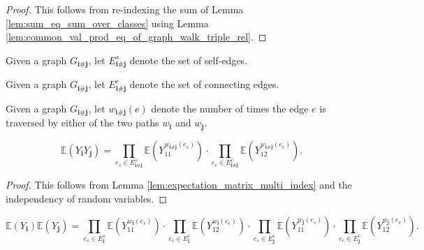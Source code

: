 \begin{proof}
  This follows from re-indexing the sum of Lemma \ref{lem:sum_eq_sum_over_classes} using Lemma \ref{lem:common_val_prod_eq_of_graph_walk_triple_rel}.
\end{proof}
\begin{definition}
  \notready
  \label{def:graph_walk_triple_single_edges}
  Given a graph $G_{\mathbf{i} \# \mathbf{j}}$, let $E^s_{\mathbf{i} \# \mathbf{j}}$ denote the set of self-edges.
\end{definition}
\begin{definition}
  \notready
  \label{def:graph_walk_triple_repeated_edges} %
  Given a graph $G_{\mathbf{i} \# \mathbf{j}}$, let $E^c_{\mathbf{i} \# \mathbf{j}}$ denote the set of connecting edges.
\end{definition}
\begin{definition}
  \notready
  \label{def:edgeCountPair}
  Given a graph $G_{\mathbf{i} \# \mathbf{j}}$, 
  let $w_{\mathbf{i} \# \mathbf{j}}(e)$ denote the number of times the edge $e$ is traversed by either of the two paths $w_\mathbf{i}$ and $w_\mathbf{j}$.
\end{definition}
\begin{lemma}
  \notready
  \label{lem:expect_mul_eq_prod_expect_edgewise_of_indep}
  \[
  \mathbb{E} (Y_\mathbf{i}Y_\mathbf{j}) 
  = \prod_{e_s \in E^s_{\mathbf{i} \# \mathbf{j}}} \mathbb{E} (Y_{11}^{w_{\mathbf{i} \# \mathbf{j}}(e_s)}) \cdot \prod_{e_c \in E^c_{\mathbf{i} \# \mathbf{j}}} \mathbb{E} (Y_{12}^{w_{\mathbf{i} \# \mathbf{j}}(e_c)}).
  \]
\end{lemma}
\begin{proof}
  This follows from Lemma \ref{lem:expectation_matrix_multi_index} and the independency of random variables.
\end{proof}
\begin{lemma}
  \notready
  \label{lem:expect_mul_eq_prod_expect_edgewise_mul_prod_expect_edgewise}
  \[
  \mathbb{E}(Y_\mathbf{i}) \mathbb{E}(Y_\mathbf{j}) 
  = \prod_{e_s \in E^s_{\mathbf{i}}} \mathbb{E} (Y_{11}^{w_{\mathbf{i}}(e_s)}) \cdot \prod_{e_c \in E^c_{\mathbf{i}}} \mathbb{E} (Y_{12}^{w_{\mathbf{i}}(e_c)})
  \cdot \prod_{e_s \in E^s_{\mathbf{j}}} \mathbb{E} (Y_{11}^{w_{\mathbf{j}}(e_s)}) \cdot \prod_{e_c \in E^c_{\mathbf{j}}} \mathbb{E} (Y_{12}^{w_{\mathbf{j}}(e_c)}).
  \]
\end{lemma}
